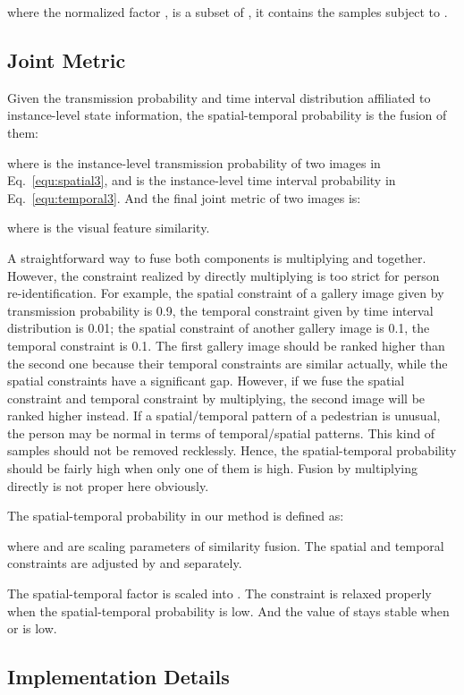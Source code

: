 \documentclass[10pt,twocolumn,letterpaper]{article}
\begin{document}
where the normalized factor ,  is a subset of , it contains the samples subject to .




\subsection{Joint Metric}

Given the transmission probability and time interval distribution affiliated to instance-level state information, the spatial-temporal probability is the fusion of them:

where  is the instance-level transmission probability of two images in Eq.~\ref{equ:spatial3}, and  is the instance-level time interval probability in Eq.~\ref{equ:temporal3}. And the final joint metric of two images is:

where  is the visual feature similarity.

A straightforward way to fuse both components is multiplying  and  together. 
However, the constraint realized by directly multiplying is too strict for person re-identification.
For example, the spatial constraint of a gallery image given by transmission probability is 0.9, the temporal constraint given by time interval distribution is 0.01; the spatial constraint of another gallery image is 0.1, the temporal constraint is 0.1. 
The first gallery image should be ranked higher than the second one because their temporal constraints are similar actually, while the spatial constraints have a significant gap.
However, if we fuse the spatial constraint and temporal constraint by multiplying, the second image will be ranked higher instead.
If a spatial/temporal pattern of a pedestrian is unusual, the person may be normal in terms of temporal/spatial patterns. This kind of samples should not be removed recklessly.
Hence, the spatial-temporal probability  should be fairly high when only one of them is high. Fusion by multiplying directly is not proper here obviously.

The spatial-temporal probability in our method is defined as:

where  and  are scaling parameters of similarity fusion. The spatial and temporal constraints are adjusted by  and  separately.

The spatial-temporal factor is scaled into . The constraint is relaxed properly when the spatial-temporal probability is low. And the value of  stays stable when  or  is low.




\subsection{Implementation Details}
\end{document}

